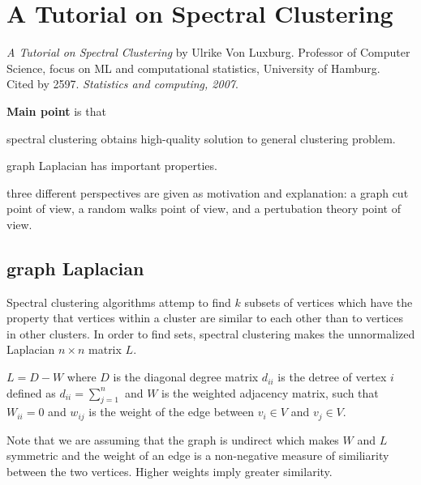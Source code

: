 \section{A Tutorial on Spectral Clustering}
\label{ch:ulrike07}

\textit{A Tutorial on Spectral Clustering} by Ulrike Von Luxburg. Professor of Computer Science, focus on ML and computational statistics, University of Hamburg.\\
Cited by 2597. \textit{Statistics and computing, 2007}.
\newline

\textbf{Main point} is that \begin{inparaenum}
\item spectral clustering obtains high-quality solution to general clustering problem.
\item graph Laplacian has important properties.
\item three different perspectives  are given as motivation and explanation: a graph cut point of view, a random walks point of view, and a pertubation theory point of view.
\end{inparaenum}

\subsection{graph Laplacian}
Spectral clustering algorithms attemp to find $k$ subsets of vertices which have the property that vertices within a cluster are similar to each other than to vertices in other clusters. In order to find sets, spectral clustering makes the unnormalized Laplacian $n \times n$ matrix $L$.

$L = D - W$ where $D$ is the diagonal degree matrix $d_{ii}$ is the detree of vertex $i$ defined as $d_{ii} = \sum_{j=1}^n$ and $W$ is the weighted adjacency matrix, such that $W_{ii} = 0$ and $w_{ij}$ is the weight of the edge between $v_i \in V$ and $v_j \in V$.

Note that we are assuming that the graph is undirect which makes $W$ and $L$ symmetric and the weight of an edge is a non-negative measure of similiarity between the two vertices. Higher weights imply greater similarity.

